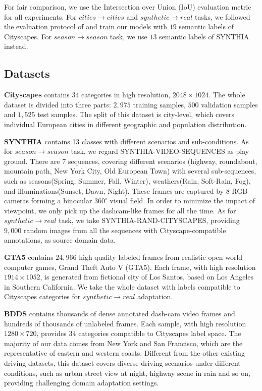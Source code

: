 \documentclass[10pt,twocolumn,letterpaper]{article}
\begin{document}
For fair comparison, we use the Intersection over Union (IoU) evaluation metric for all experiments. For $cities\rightarrow cities$ and $synthetic\rightarrow real$ tasks, we followed the evaluation protocol of \cite{cordts2016cityscapes} and train our models with $19$ semantic labels of Cityscapes. For $season\rightarrow season$ task, we use $13$ semantic labels of SYNTHIA instead. 

\subsection{Datasets}

\textbf{Cityscapes} contains 34 categories in high resolution, $2048\times1024$. The whole dataset is divided into three parts: $2,975$ training samples, $500$ validation samples and $1,525$ test samples. The split of this dataset is city-level, which covers individual European cities in different geographic and population distribution. 



\textbf{SYNTHIA} contains 13 classes with different scenarios and sub-conditions. As for $season\rightarrow season$ task, we regard SYNTHIA-VIDEO-SEQUENCES as play ground. There are $7$ sequences, covering different scenarios (highway, roundabout, mountain path, New York City, Old European Town) with several sub-sequences, such as seasons(Spring, Summer, Fall, Winter), weathers(Rain, Soft-Rain, Fog), and illuminations(Sunset, Dawn, Night). These frames are captured by $8$ RGB cameras forming a binocular $360^\circ$ visual field. In order to minimize the impact of viewpoint, we only pick up the dashcam-like frames for all the time.  As for $synthetic\rightarrow real$ task, we take SYNTHIA-RAND-CITYSCAPES, providing $9,000$ random images from all the sequences with Cityscape-compatible annotations, as source domain data. 

\textbf{GTA5} contains $24,966$ high quality labeled frames from realistic open-world computer games, Grand Theft Auto V (GTA5). Each frame, with high resolution $1914\times1052$, is generated from fictional city of Los Santos, based on Los Angeles in Southern California. We take the whole dataset with labels compatible to Cityscapes categories for $synthetic\rightarrow real$ adaptation.

\textbf{BDDS} contains thousands of dense annotated dash-cam video frames and hundreds of thousands of unlabeled frames. Each sample, with high resolution $1280\times720$, provides $34$ categories compatible to Cityscapes label space. The majority of our data comes from New York and San Francisco, which are the representative of eastern and western coasts. Different from the other existing driving datasets, this dataset covers diverse driving scenarios under different conditions, such as urban street view at night, highway scene in rain and so on, providing challenging domain adaptation settings. 
\end{document}

